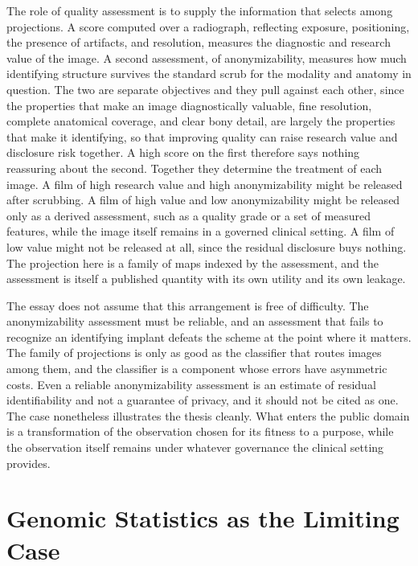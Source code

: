 \documentclass[11pt]{article}
\theoremstyle{definition}
\begin{document}
The role of quality assessment is to supply the information that selects among projections. A score computed over a radiograph, reflecting exposure, positioning, the presence of artifacts, and resolution, measures the diagnostic and research value of the image. A second assessment, of anonymizability, measures how much identifying structure survives the standard scrub for the modality and anatomy in question. The two are separate objectives and they pull against each other, since the properties that make an image diagnostically valuable, fine resolution, complete anatomical coverage, and clear bony detail, are largely the properties that make it identifying, so that improving quality can raise research value and disclosure risk together. A high score on the first therefore says nothing reassuring about the second. Together they determine the treatment of each image. A film of high research value and high anonymizability might be released after scrubbing. A film of high value and low anonymizability might be released only as a derived assessment, such as a quality grade or a set of measured features, while the image itself remains in a governed clinical setting. A film of low value might not be released at all, since the residual disclosure buys nothing. The projection here is a family of maps indexed by the assessment, and the assessment is itself a published quantity with its own utility and its own leakage.

The essay does not assume that this arrangement is free of difficulty. The anonymizability assessment must be reliable, and an assessment that fails to recognize an identifying implant defeats the scheme at the point where it matters. The family of projections is only as good as the classifier that routes images among them, and the classifier is a component whose errors have asymmetric costs. Even a reliable anonymizability assessment is an estimate of residual identifiability and not a guarantee of privacy, and it should not be cited as one. The case nonetheless illustrates the thesis cleanly. What enters the public domain is a transformation of the observation chosen for its fitness to a purpose, while the observation itself remains under whatever governance the clinical setting provides.

\section{Genomic Statistics as the Limiting Case}
\end{document}
